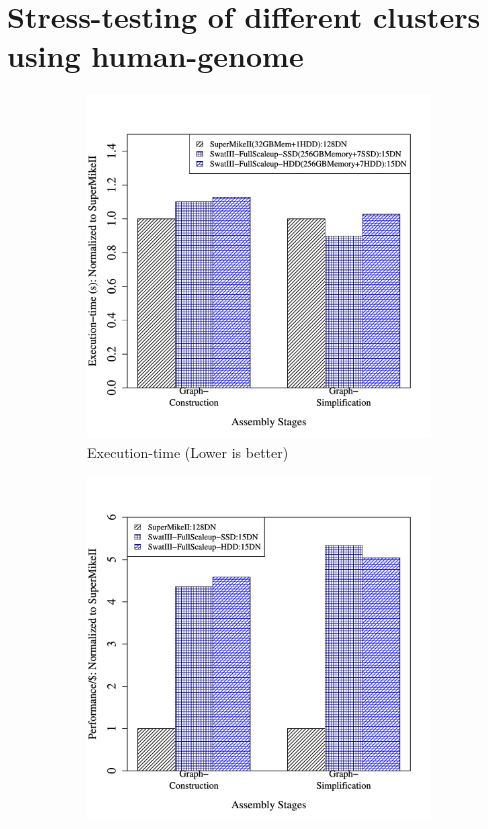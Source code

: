 \documentclass[conference]{IEEEtran}
\begin{document}
\section {Stress-testing of different clusters using human-genome }
\begin{figure}[htb]
        \begin{subfigure}[b]{0.23\textwidth}
                \includegraphics[width=\textwidth]{Figure/PerormanceData/Plots/PerfDiffArchHum.pdf}
                \caption{Execution-time (Lower is better)}
                \label{fig:DifferentArchitecturesPerfHum}
        \end{subfigure}
        \begin{subfigure}[b]{0.23\textwidth}
                \includegraphics[width=\textwidth]{Figure/PerormanceData/Plots/PerfPerDollarDiffArchHum.pdf}

\end{subfigure}
\end{figure}
\end{document}
